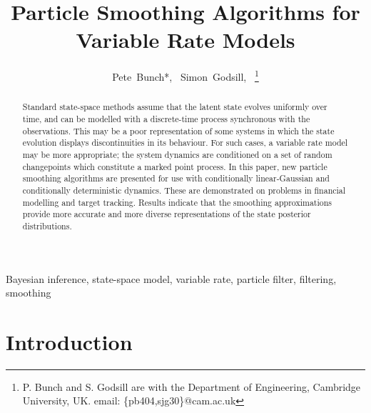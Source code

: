 \documentclass[peerreview,11pt,draftcls,onecolumn]{IEEEtran}
\begin{document}
\title{Particle Smoothing Algorithms for Variable Rate Models}

\author{Pete~Bunch*,~
        Simon~Godsill,~%
\thanks{P. Bunch and S. Godsill are with the Department
of Engineering, Cambridge University, UK. email: \{pb404,sjg30\}@cam.ac.uk}%
}%



\maketitle

\begin{abstract}
Standard state-space methods assume that the latent state evolves uniformly over time, and can be modelled with a discrete-time process synchronous with the observations. This may be a poor representation of some systems in which the state evolution displays discontinuities in its behaviour. For such cases, a variable rate model may be more appropriate; the system dynamics are conditioned on a set of random changepoints which constitute a marked point process. In this paper, new particle smoothing algorithms are presented for use with conditionally linear-Gaussian and conditionally deterministic dynamics. These are demonstrated on problems in financial modelling and target tracking. Results indicate that the smoothing approximations provide more accurate and more diverse representations of the state posterior distributions.
\end{abstract}

\begin{IEEEkeywords}
Bayesian inference, state-space model, variable rate, particle filter, filtering, smoothing
\end{IEEEkeywords}



\section{Introduction}
\end{document}
